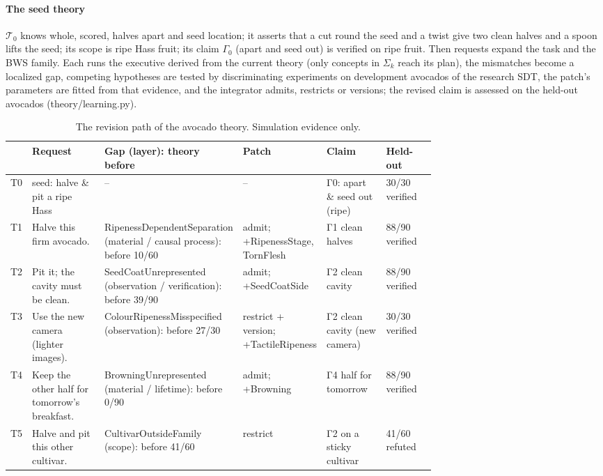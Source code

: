 \documentclass[10.5pt,a4paper]{article}
\begin{document}
\paragraph{The seed theory} $\mathcal{T}_0$ knows whole, scored, halves apart and seed location; it asserts that a cut
round the seed and a twist give two clean halves and a spoon lifts the seed; its scope is ripe Hass fruit; its claim
$\Gamma_0$ (apart and seed out) is verified on ripe fruit. Then requests expand the task and the BWS family. Each runs
the executive derived from the current theory (only concepts in $\Sigma_k$ reach its plan), the mismatches become a
localized gap, competing hypotheses are tested by discriminating experiments on development avocados of the research
SDT, the patch's parameters are fitted from that evidence, and the integrator admits, restricts or versions; the
revised claim is assessed on the held-out avocados (theory/learning.py).
\begin{table}[htbp]\centering\scriptsize\caption{The revision path of the avocado theory. Simulation evidence only.}
\begin{tabularx}{\linewidth}{@{}lp{0.17\linewidth}p{0.22\linewidth}p{0.18\linewidth}p{0.14\linewidth}X@{}}\toprule  & Request & Gap (layer): theory before & Patch & Claim & Held-out \\\midrule
T0 & seed: halve \& pit a ripe Hass & -- & -- & Γ0: apart \& seed out (ripe) & 30/30 verified \\
T1 & Halve this firm avocado. & RipenessDependentSeparation (material / causal process): before 10/60 & admit; +RipenessStage, TornFlesh & Γ1 clean halves & 88/90 verified \\
T2 & Pit it; the cavity must be clean. & SeedCoatUnrepresented (observation / verification): before 39/90 & admit; +SeedCoatSide & Γ2 clean cavity & 88/90 verified \\
T3 & Use the new camera (lighter images). & ColourRipenessMisspecified (observation): before 27/30 & restrict + version; +TactileRipeness & Γ2 clean cavity (new camera) & 30/30 verified \\
T4 & Keep the other half for tomorrow's breakfast. & BrowningUnrepresented (material / lifetime): before 0/90 & admit; +Browning & Γ4 half for tomorrow & 88/90 verified \\
T5 & Halve and pit this other cultivar. & CultivarOutsideFamily (scope): before 41/60 & restrict & Γ2 on a sticky cultivar & 41/60 refuted \\\bottomrule\end{tabularx}\end{table}
\end{document}
